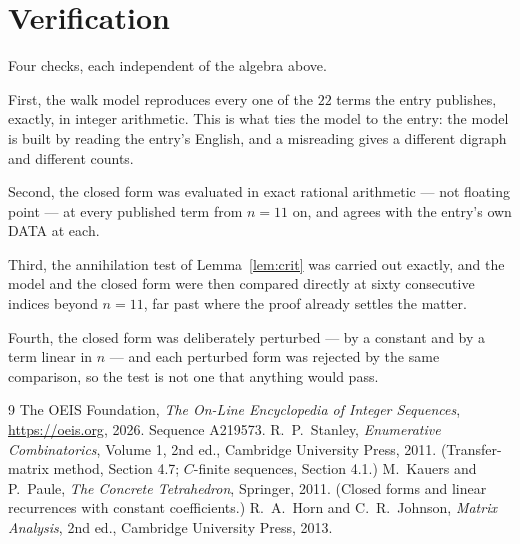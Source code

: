 \documentclass[11pt,a4paper]{article}
\theoremstyle{plain}
\theoremstyle{definition}
\begin{document}
\section{Verification}

Four checks, each independent of the algebra above.

First, the walk model reproduces every one of the $22$ terms the entry publishes,
exactly, in integer arithmetic. This is what ties the model to the entry: the model is built
by reading the entry's English, and a misreading gives a different digraph and different
counts.

Second, the closed form was evaluated in exact rational arithmetic --- not floating point ---
at every published term from $n=11$ on, and agrees with the entry's own DATA at each.

Third, the annihilation test of Lemma~\ref{lem:crit} was carried out exactly, and the model
and the closed form were then compared directly at sixty consecutive indices beyond
$n=11$, far past where the proof already settles the matter.

Fourth, the closed form was deliberately perturbed --- by a constant and by a term linear in
$n$ --- and each perturbed form was rejected by the same comparison, so the test is not one
that anything would pass.

\begin{thebibliography}{9}
 The OEIS Foundation, \emph{The On-Line Encyclopedia of Integer
Sequences}, \url{https://oeis.org}, 2026. Sequence A219573.
 R.~P.~Stanley, \emph{Enumerative Combinatorics}, Volume 1, 2nd ed.,
Cambridge University Press, 2011. (Transfer-matrix method, Section 4.7; $C$-finite sequences,
Section 4.1.)
 M.~Kauers and P.~Paule, \emph{The Concrete Tetrahedron}, Springer, 2011.
(Closed forms and linear recurrences with constant coefficients.)
 R.~A.~Horn and C.~R.~Johnson, \emph{Matrix Analysis}, 2nd ed., Cambridge
University Press, 2013.
\end{thebibliography}
\end{document}
